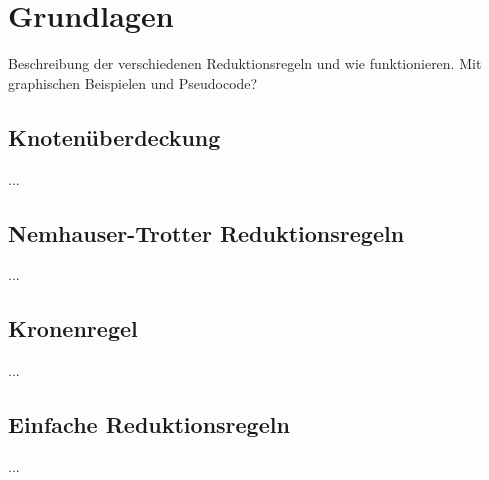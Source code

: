 
\chapter{Grundlagen}
\label{ch:Grundlagen}
Beschreibung der verschiedenen Reduktionsregeln und wie funktionieren. Mit graphischen Beispielen und Pseudocode?


\section{Knotenüberdeckung}
\label{ch:Grundlagen:sec:Knotenüberdeckung}

...

\section{Nemhauser-Trotter Reduktionsregeln}
\label{ch:Grundlagen:sec:Nemhauser-Trotter Reduktionsregeln}

...

\section{Kronenregel}
\label{ch:Grundlagen:sec:Kronenregel}

...

\section{Einfache Reduktionsregeln}
\label{ch:Grundlagen:sec:Einfache Reduktionsregeln}

...


